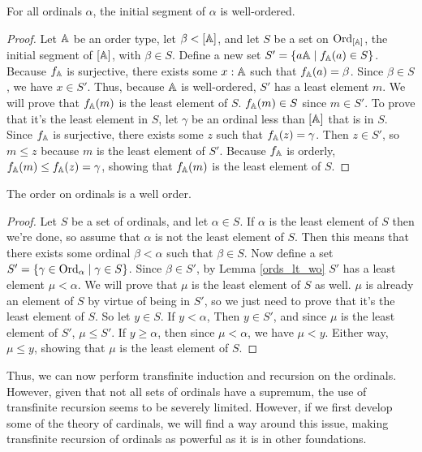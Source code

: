 \documentclass[../../math.tex]{subfiles}
\begin{document}
\begin{lemma} \label{ords_lt_wo}
    For all ordinals $\alpha$, the initial segment of $\alpha$ is well-ordered.
\end{lemma}
\begin{proof}
    Let $\mathbb{A}$ be an order type, let $\beta < [\mathbb{A}]$, and let $S$ be a set on
    $\operatorname{Ord}_{[\mathbb{A}]}$, the initial segment of $[\mathbb{A}]$, with $\beta \in S$.  Define a
    new set $S' = \{a \mathbb{A} \mid f_{\mathbb{A}}(a) \in S\}$.  Because $f_{\mathbb{A}}$ is surjective,
    there exists some $x : \mathbb{A}$ such that $f_{\mathbb{A}}(a) = \beta$.  Since $\beta \in
    S$, we have $x \in S'$.  Thus, because $\mathbb{A}$ is well-ordered, $S'$ has a
    least element $m$.  We will prove that $f_{\mathbb{A}}(m)$ is the least element of
    $S$.  $f_{\mathbb{A}}(m) \in S$ since $m \in S'$.  To prove that it's the least
    element in $S$, let $\gamma$ be an ordinal less than $[\mathbb{A}]$ that is in $S$.
    Since $f_{\mathbb{A}}$ is surjective, there exists some $z$ such that $f_{\mathbb{A}}(z) =
    \gamma$.  Then $z \in S'$, so $m \leq z$ because $m$ is the least element of
    $S'$.  Because $f_{\mathbb{A}}$ is orderly, $f_{\mathbb{A}}(m) \leq f_{\mathbb{A}}(z) = \gamma$, showing
    that $f_{\mathbb{A}}(m)$ is the least element of $S$.
\end{proof}

\begin{instance}
    The order on ordinals is a well order.
\end{instance}
\begin{proof}
    Let $S$ be a set of ordinals, and let $\alpha \in S$.  If $\alpha$ is the
    least element of $S$ then we're done, so assume that $\alpha$ is not the
    least element of $S$.  Then this means that there exists some ordinal $\beta
    < \alpha$ such that $\beta \in S$.  Now define a set $S' = \{\gamma \in
    \operatorname{Ord}_\alpha \mid \gamma \in S\}$.  Since $\beta \in S'$, by Lemma
    \ref{ords_lt_wo} $S'$ has a least element $\mu < \alpha$.  We will prove
    that $\mu$ is the least element of $S$ as well.  $\mu$ is already an element
    of $S$ by virtue of being in $S'$, so we just need to prove that it's the
    least element of $S$.  So let $y \in S$.  If $y < \alpha$, Then $y \in S'$,
    and since $\mu$ is the least element of $S'$, $\mu \leq S'$.  If $y \geq
    \alpha$, then since $\mu < \alpha$, we have $\mu < y$.  Either way, $\mu
    \leq y$, showing that $\mu$ is the least element of $S$.
\end{proof}

Thus, we can now perform transfinite induction and recursion on the ordinals.
However, given that not all sets of ordinals have a supremum, the use of
transfinite recursion seems to be severely limited.  However, if we first
develop some of the theory of cardinals, we will find a way around this issue,
making transfinite recursion of ordinals as powerful as it is in other
foundations.
\end{document}
